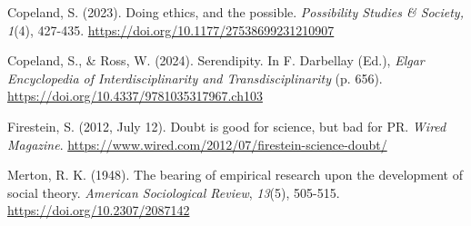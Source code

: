 \documentclass[authordate, empirical]{jote-new-article}
\begin{document}
	Copeland, S. (2023). Doing ethics, and the possible. \emph{Possibility Studies \& Society,} \emph{1}(4), 427-435. \url{https://doi.org/10.1177/27538699231210907}


	Copeland, S., \& Ross, W. (2024). Serendipity. In F. Darbellay (Ed.), \emph{Elgar Encyclopedia of Interdisciplinarity and Transdisciplinarity }(p. 656). \url{https://doi.org/10.4337/9781035317967.ch103}

	Firestein, S. (2012, July 12). Doubt is good for science, but bad for PR. \emph{Wired Magazine}. \url{https://www.wired.com/2012/07/firestein-science-doubt/}

	Merton, R. K. (1948). The bearing of empirical research upon the development of social theory. \emph{American Sociological Review}, \emph{13}(5), 505-515. \url{https://doi.org/10.2307/2087142}
\end{document}
